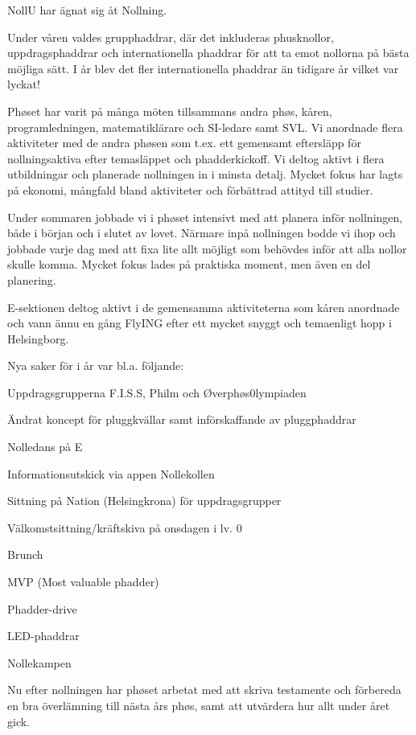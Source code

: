 \documentclass[../_main/handlingar.tex]{subfiles}
\begin{document}
NollU har ägnat sig åt Nollning.

Under våren valdes grupphaddrar, där det inkluderas phusknollor, uppdragsphaddrar och internationella phaddrar för att ta emot nollorna på bästa möjliga sätt. I år blev det fler internationella phaddrar än tidigare år vilket var lyckat!

Phøset har varit på många möten tillsammans andra phøs, kåren, programledningen, matematiklärare och SI-ledare samt SVL. Vi anordnade flera aktiviteter med de andra phøsen som t.ex. ett gemensamt eftersläpp för nollningsaktiva efter temasläppet och phadderkickoff. Vi deltog aktivt i flera utbildningar och planerade nollningen in i minsta detalj. Mycket fokus har lagts på ekonomi, mångfald bland aktiviteter och förbättrad attityd till studier.

Under sommaren jobbade vi i phøset intensivt med att planera inför nollningen, både i början och i slutet av lovet. Närmare inpå nollningen bodde vi ihop och jobbade varje dag med att fixa lite allt möjligt som behövdes inför att alla nollor skulle komma. Mycket fokus lades på praktiska moment, men även en del planering.

E-sektionen deltog aktivt i de gemensamma aktiviteterna som kåren anordnade och vann ännu en gång FlyING efter ett mycket snyggt och temaenligt hopp i Helsingborg.

Nya saker för i år var bl.a. följande:
\begin{dashlist}
 \item Uppdragsgrupperna F.I.S.S, Philm och Øverphøs0lympiaden
 \item Ändrat koncept för pluggkvällar samt införskaffande av pluggphaddrar
 \item Nolledans på E
 \item Informationsutskick via appen Nollekollen
 \item Sittning på Nation (Helsingkrona) för uppdragsgrupper
 \item Välkomstsittning/kräftskiva på onsdagen i lv. 0
 \item Brunch
 \item MVP (Most valuable phadder)
 \item Phadder-drive
 \item LED-phaddrar
 \item Nollekampen
\end{dashlist}
Nu efter nollningen har phøset arbetat med att skriva testamente och förbereda en bra överlämning till nästa års phøs, samt att utvärdera hur allt under året gick.
\end{document}
